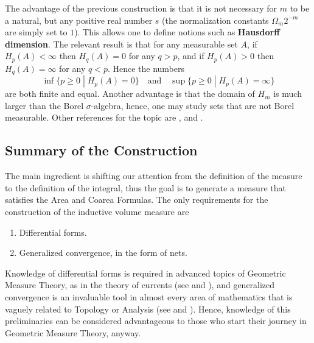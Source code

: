 \documentclass[%
 aip,
 amsmath,amssymb,
 reprint,%
jmp]{revtex4-2}
\begin{document}
The advantage of the previous construction is that it is not necessary for $m$ to be a natural, but any positive real number $s$ (the normalization constants $\Omega_{m}2^{-m}$ are simply set to $1$). This allows one to define notions such as \textbf{Hausdorff dimension}. The relevant result is that for any measurable set $A$, if $H_{p}(A) < \infty$ then $H_{q}(A) = 0$ for any $q > p$, and if $H_{p}(A) > 0$ then $H_{q}(A) = \infty$ for any $q < p$. Hence the numbers
\begin{equation*}
    \inf \{p \geq 0\;|\;H_{p}(A) = 0\} \quad\text{and}\quad \sup \{p \geq 0\;|\;H_{p}(A) = \infty\}
\end{equation*}
are both finite and equal. Another advantage is that the domain of $H_{m}$ is much larger than the Borel $\sigma$-algebra, hence, one may study sets that are not Borel measurable. Other references for the topic are \cite{Federer}, \cite{Folland} and \cite{Evans}.

\subsection{Summary of the Construction}

The main ingredient is shifting our attention from the definition of the measure to the definition of the integral, thus the goal is to generate a measure that satisfies the Area and Coarea Formulas. The only requirements for the construction of the inductive volume measure are
\begin{enumerate}
    \item Differential forms.
    \item Generalized convergence, in the form of nets.
\end{enumerate}
Knowledge of differential forms is required in advanced topics of Geometric Measure Theory, as in the theory of currents (see \cite{Federer} and \cite{Krantz}), and generalized convergence is an invaluable tool in almost every area of mathematics that is vaguely related to Topology or Analysis (see \cite{Megginson} and \cite{Macheras}). Hence, knowledge of this preliminaries can be considered advantageous to those who start their journey in Geometric Measure Theory, anyway.
\end{document}
